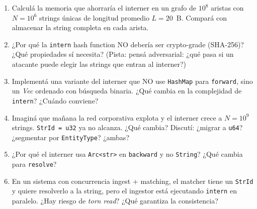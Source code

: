 \begin{ejercicios}
\begin{enumerate}
    \item \starred{} Calculá la memoria que ahorraría el interner en
    un grafo de \(10^8\) aristas con \(N = 10^6\) strings únicas de
    longitud promedio \(L = 20\)~B. Compará con almacenar la string
    completa en cada arista.

    \item ¿Por qué la \texttt{intern} hash function NO debería ser
    crypto-grade (SHA-256)? ¿Qué propiedades sí necesita? (Pista:
    pensá adversarial: ¿qué pasa si un atacante puede elegir las
    strings que entran al interner?)

    \item \starred{} Implementá una variante del interner que NO
    use \texttt{HashMap} para \texttt{forward}, sino un \emph{Vec}
    ordenado con búsqueda binaria. ¿Qué cambia en la complejidad de
    \texttt{intern}? ¿Cuándo conviene?

    \item Imaginá que mañana la red corporativa explota y el
    interner crece a \(N = 10^9\) strings. \texttt{StrId = u32} ya
    no alcanza. ¿Qué cambia? Discutí: ¿migrar a \texttt{u64}?
    ¿segmentar por \texttt{EntityType}? ¿ambas?

    \item ¿Por qué el interner usa \texttt{Arc<str>} en
    \texttt{backward} y no \texttt{String}? ¿Qué cambia para
    \texttt{resolve}?

    \item En un sistema con concurrencia ingest + matching, el
    matcher tiene un \texttt{StrId} y quiere resolverlo a la string,
    pero el ingestor está ejecutando \texttt{intern} en paralelo.
    ¿Hay riesgo de \emph{torn read}? ¿Qué garantiza la consistencia?
\end{enumerate}
\end{ejercicios}
